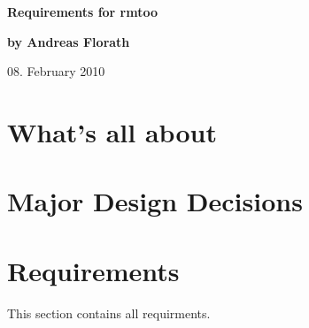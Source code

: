 \documentclass{article}
\begin{document}
\thispagestyle{empty}

\vfill

{\LARGE\textbf{Requirements for rmtoo}}

\vfill

{\Large\textbf{by Andreas Florath}}

\vfill

08. February 2010

\vfill

\newpage

\tableofcontents

\newpage

\section{What's all about}


\section{Major Design Decisions}





\section{Requirements}
This section contains all requirments.


\end{document}

